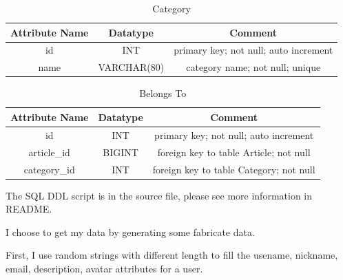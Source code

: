 \documentclass[11pt]{homework}
\begin{document}
  \begin{table}[h!]
    \begin{center}
      \caption{Category}
      \label{tab:table4}
      \begin{tabular}{c|c|c} %
        \textbf{Attribute Name} & \textbf{Datatype} & \textbf{Comment}\\
        \hline
        id & INT & primary key; not null; auto increment \\
        name & VARCHAR(80) & category name; not null; unique \\
      \end{tabular}
    \end{center}
  \end{table}

  \begin{table}[h!]
    \begin{center}
      \caption{Belongs To}
      \label{tab:table5}
      \begin{tabular}{c|c|c} %
        \textbf{Attribute Name} & \textbf{Datatype} & \textbf{Comment}\\
        \hline
        id & INT & primary key; not null; auto increment \\
        article\_id & BIGINT & foreign key to table Article; not null \\
        category\_id & INT & foreign key to table Category; not null \\
      \end{tabular}
    \end{center}
  \end{table}

  \newpage

  The SQL DDL script is in the source file, please see more information in README.



















  I choose to get my data by generating some fabricate data.

  First, I use random strings with different length to fill the usename, nickname, email, 
  description, avatar attributes for a user.
\end{document}
